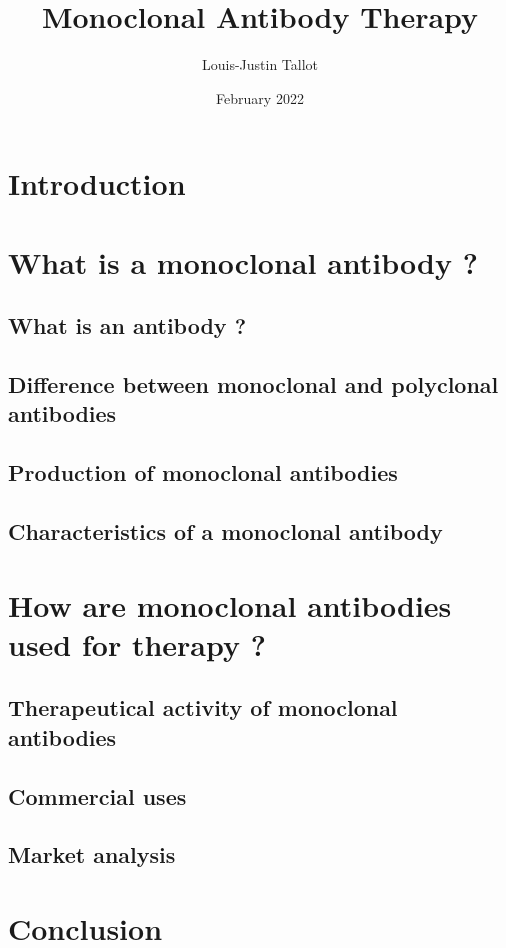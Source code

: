 \documentclass{article}
\title{
  \textbf{Monoclonal Antibody Therapy}
}
\author{Louis-Justin Tallot}
\date{February 2022}
\begin{document}
  \maketitle

  \section*{Introduction}

  \section{What is a monoclonal antibody ?}

    \subsection{What is an antibody ?}

    \subsection{Difference between monoclonal and polyclonal antibodies}

    \subsection{Production of monoclonal antibodies}

    \subsection{Characteristics of a monoclonal antibody}

  \section{How are monoclonal antibodies used for therapy ?}

    \subsection{Therapeutical activity of monoclonal antibodies}

    \subsection{Commercial uses}

    \subsection{Market analysis}
    
  
  \section*{Conclusion}


  \printbibliography
\end{document}
